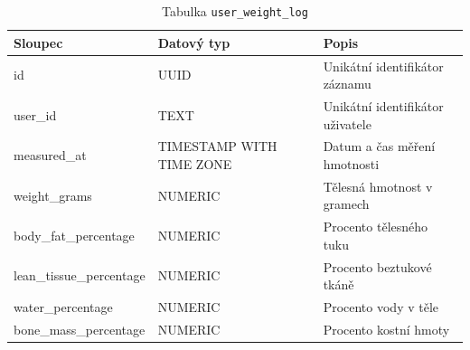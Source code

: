 \begin{table}[ht!]
    \centering
    \begin{tabularx}{\textwidth}{|l|l|L|}
        \hline
        \textbf{Sloupec}         & \textbf{Datový typ}      & \textbf{Popis}                   \\ \hline
        id                       & UUID                     & Unikátní identifikátor záznamu   \\ \hline
        user\_id                 & TEXT                     & Unikátní identifikátor uživatele \\ \hline
        measured\_at             & TIMESTAMP WITH TIME ZONE & Datum a čas měření hmotnosti     \\ \hline
        weight\_grams            & NUMERIC                  & Tělesná hmotnost v gramech       \\ \hline
        body\_fat\_percentage    & NUMERIC                  & Procento tělesného tuku          \\ \hline
        lean\_tissue\_percentage & NUMERIC                  & Procento beztukové tkáně         \\ \hline
        water\_percentage        & NUMERIC                  & Procento vody v těle             \\ \hline
        bone\_mass\_percentage   & NUMERIC                  & Procento kostní hmoty            \\ \hline
    \end{tabularx}
    \caption{Tabulka \texttt{user\_weight\_log}}
    \label{tab:user_weight_log}
\end{table}
